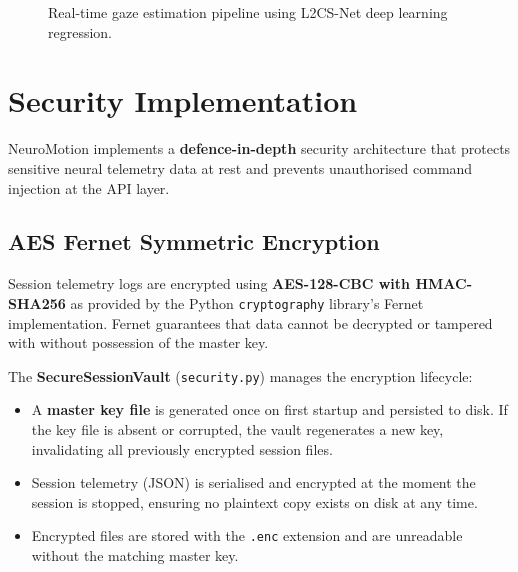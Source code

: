 \documentclass[12pt, a4paper, oneside]{report}
\begin{document}
\begin{description}
\begin{figure}[htbp]
\caption{Real-time gaze estimation pipeline using L2CS-Net deep learning regression.}
\label{fig:gaze_pipeline}
\end{figure}

\section{Security Implementation}
\label{sec:security}

NeuroMotion implements a \textbf{defence-in-depth} security architecture that
protects sensitive neural telemetry data at rest and prevents unauthorised command
injection at the API layer.

\subsection{AES Fernet Symmetric Encryption}

Session telemetry logs are encrypted using \textbf{AES-128-CBC with HMAC-SHA256}
as provided by the Python \texttt{cryptography} library's Fernet implementation.
Fernet guarantees that data cannot be decrypted or tampered with without possession
of the master key.

The \textbf{SecureSessionVault} (\texttt{security.py}) manages the encryption
lifecycle:
\begin{itemize}
  \item A \textbf{master key file} is generated once on first startup and persisted
        to disk. If the key file is absent or corrupted, the vault regenerates a new
        key, invalidating all previously encrypted session files.
  \item Session telemetry (JSON) is serialised and encrypted at the moment the
        session is stopped, ensuring no plaintext copy exists on disk at any time.
  \item Encrypted files are stored with the \texttt{.enc} extension and are
        unreadable without the matching master key.
\end{itemize}


\end{description}
\end{document}
